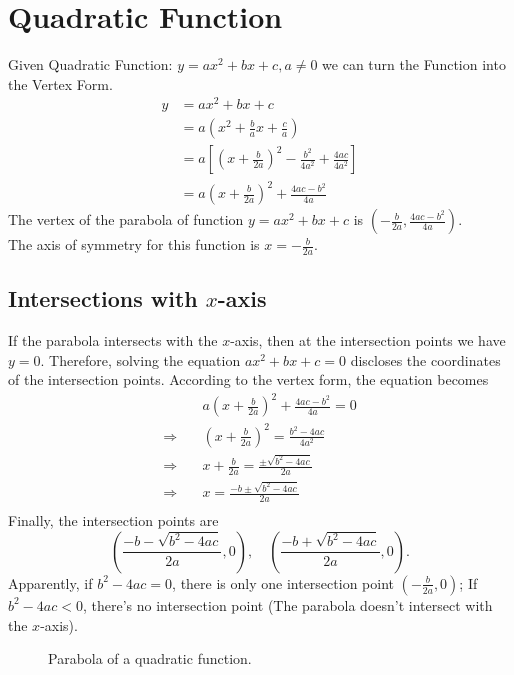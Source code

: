 \documentclass[11pt, oneside]{article}   	%
\begin{document}
\section{Quadratic Function}
Given Quadratic Function: $y=ax^2+bx+c, a \ne 0$
we can turn the Function into the Vertex Form.
\begin{align*}
y&=ax^2+bx+c\\
&=a\left(x^2+\frac{b}{a}x+\frac{c}{a}\right)\\
&=a\left[(x+\frac{b}{2a})^2-\frac{b^2}{4a^2}+\frac{4ac}{4a^2}\right]\\
&=a\left(x+\frac{b}{2a}\right)^2+\frac{4ac-b^2}{4a}
\end{align*}
The vertex of the parabola of function $y=ax^2+bx+c$ is $(-\frac{b}{2a},\frac{4ac-b^2}{4a})$.\\
The axis of symmetry  for this function is $x=-\frac{b}{2a}$.

\subsection{Intersections with $x$-axis}
If the parabola intersects with the $x$-axis, then at the intersection points we have $y=0$. Therefore, solving the equation $ax^2+bx+c=0$ discloses the coordinates of the intersection points. According to the vertex form, the equation becomes 
\begin{align*} 
&a\left(x+\frac{b}{2a}\right)^2+\frac{4ac-b^2}{4a}=0\\
\Rightarrow \quad &\left(x+\frac{b}{2a}\right)^2=\frac{b^2-4ac}{4a^2}\\
\Rightarrow \quad &x+\frac{b}{2a}=\frac{\pm \sqrt{b^2-4ac}}{2a}\\
\Rightarrow \quad &x=\frac{-b\pm \sqrt{b^2-4ac}}{2a}\\
\end{align*}
Finally, the intersection points are
\[(\frac{-b - \sqrt{b^2-4ac}}{2a},0), \quad (\frac{-b + \sqrt{b^2-4ac}}{2a},0) .\]
Apparently, if $b^2-4ac=0$, there is only one intersection point $(-\frac{b}{2a},0)$;
If $b^2-4ac<0$, there's no intersection point (The parabola doesn't intersect with the $x$-axis).
\begin{figure}
\centering
{}
\caption{Parabola of a quadratic function.}
\label{fig:parabola}
\end{figure}
\end{document}
